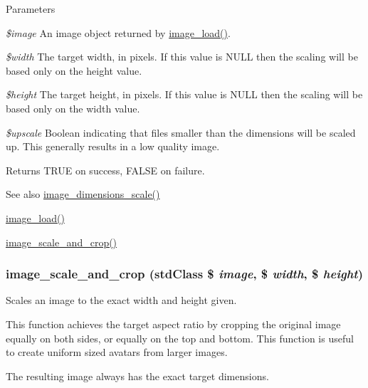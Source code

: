 \begin{DoxyParams}{Parameters}
\item[{\em \$image}]An image object returned by \hyperlink{group__image_ga96098e5b039dc3906a656fa889a04776}{image\_\-load()}. \item[{\em \$width}]The target width, in pixels. If this value is NULL then the scaling will be based only on the height value. \item[{\em \$height}]The target height, in pixels. If this value is NULL then the scaling will be based only on the width value. \item[{\em \$upscale}]Boolean indicating that files smaller than the dimensions will be scaled up. This generally results in a low quality image.\end{DoxyParams}
\begin{DoxyReturn}{Returns}
TRUE on success, FALSE on failure.
\end{DoxyReturn}
\begin{DoxySeeAlso}{See also}
\hyperlink{group__image_gaf85b92c29d7c70328ccc3401357eaee9}{image\_\-dimensions\_\-scale()} 

\hyperlink{group__image_ga96098e5b039dc3906a656fa889a04776}{image\_\-load()} 

\hyperlink{group__image_ga8d6850eecb498cf1683808eb66b74465}{image\_\-scale\_\-and\_\-crop()} 
\end{DoxySeeAlso}
\hypertarget{group__image_ga8d6850eecb498cf1683808eb66b74465}{
\subsubsection[{image\_\-scale\_\-and\_\-crop}]{\setlength{\rightskip}{0pt plus 5cm}image\_\-scale\_\-and\_\-crop (stdClass \$ {\em image}, \/  \$ {\em width}, \/  \$ {\em height})}}
\label{group__image_ga8d6850eecb498cf1683808eb66b74465}
Scales an image to the exact width and height given.

This function achieves the target aspect ratio by cropping the original image equally on both sides, or equally on the top and bottom. This function is useful to create uniform sized avatars from larger images.

The resulting image always has the exact target dimensions.


